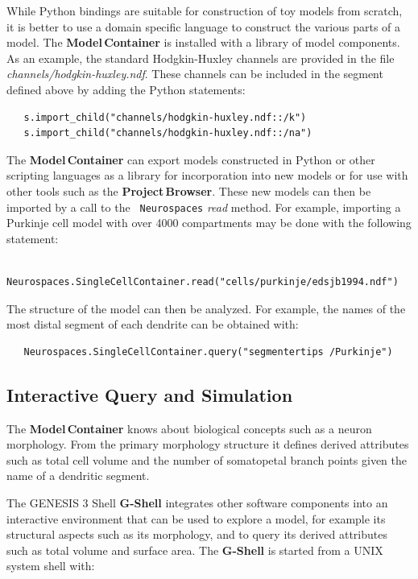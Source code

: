 \documentclass[12pt]{article}
\begin{document}
While Python bindings are suitable for construction of toy models from
scratch, it is better to use a domain specific language to construct
the various parts of a model. The {\bf Model\,Container} is
installed with a library of model components.  As an example, the
standard Hodgkin-Huxley channels are provided in the file {\it
  channels/hodgkin-huxley.ndf}.  These channels can be included in the
segment defined above by adding the Python statements:

{\footnotesize
  \resetlinenumber[23]
  \linenumbers
\begin{verbatim}
   s.import_child("channels/hodgkin-huxley.ndf::/k")
   s.import_child("channels/hodgkin-huxley.ndf::/na")
\end{verbatim}
}

The {\bf Model\,Container} can export models constructed in Python or other
scripting languages as a library for incorporation into new models or
for use with other tools such as the {\bf Project\,Browser}.
These new models can then be imported by a call to the {\tt
  Neurospaces} {\it read} method. For example, importing a Purkinje
cell model with over 4000 compartments may be done with the following
statement:

{\footnotesize
\begin{verbatim}
   Neurospaces.SingleCellContainer.read("cells/purkinje/edsjb1994.ndf")
\end{verbatim}
}

The structure of the model can then be analyzed.  For example, the
names of the most distal segment of each dendrite can be obtained
with:

{\footnotesize
\begin{verbatim}
   Neurospaces.SingleCellContainer.query("segmentertips /Purkinje")
\end{verbatim}
}

\subsection{Interactive Query and Simulation}

The {\bf Model\,Container} knows about biological concepts such as a neuron
morphology.  From the primary morphology structure it defines derived
attributes such as total cell volume and the number of somatopetal
branch points given the name of a dendritic segment.

The GENESIS 3 Shell {\bf G-Shell} integrates other software components into an
interactive environment that can be used to explore a
model, for example its structural aspects such as its morphology, and to query its
derived attributes such as total volume and surface area.  The {\bf
  G-Shell} is started from a UNIX system shell with:
\end{document}
